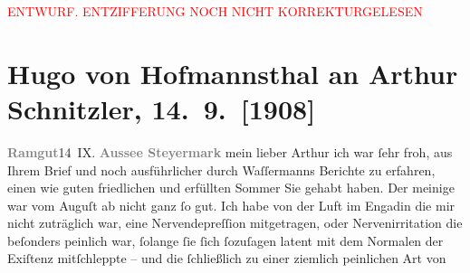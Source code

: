 
\begin{center}
            \textcolor{red}{ENTWURF. ENTZIFFERUNG NOCH NICHT KORREKTURGELESEN}
                      \end{center}
            
               \section[Hugo von Hofmannsthal an Arthur Schnitzler, 14. 9. {[}1908{]}]{ Hugo von Hofmannsthal an Arthur Schnitzler, 14. 9. {[}1908{]}}\nopagebreak{}\rehead{ }\begin{ledgroupsized}[t]{13cm}\normalsize\beginnumbering{} \toendnotes[C]{\smallbreak\pagebreak[2]} 
\toendnotes[C]{\smallbreak}\pstart
           {\pb}\textcolor{gray}{\textbf{Ramgut}}\hfill 14 IX.\pend
           \pstart
           \textcolor{gray}{\textbf{Aussee Steyermark}}\pend
           \pstart{}mein lieber Arthur\pend\pstart
           ich war ſehr froh, aus Ihrem Brief und noch ausführlicher durch Waſſermanns Berichte zu erfahren, einen wie guten friedlichen
               und erfüllten Sommer Sie gehabt haben. Der meinige war vom Auguſt ab nicht ganz ſo
               gut. Ich habe von der Luft im Engadin die mir nicht
               zuträglich war, eine Nervendepreſſion {\pb}mitgetragen, oder Nervenirritation
               die beſonders peinlich war, ſolange ſie ſich ſozuſagen latent mit dem Normalen der
               Exiſtenz mitſchleppte – und die ſchließlich zu einer ziemlich peinlichen Art von

\end{ledgroupsized}
